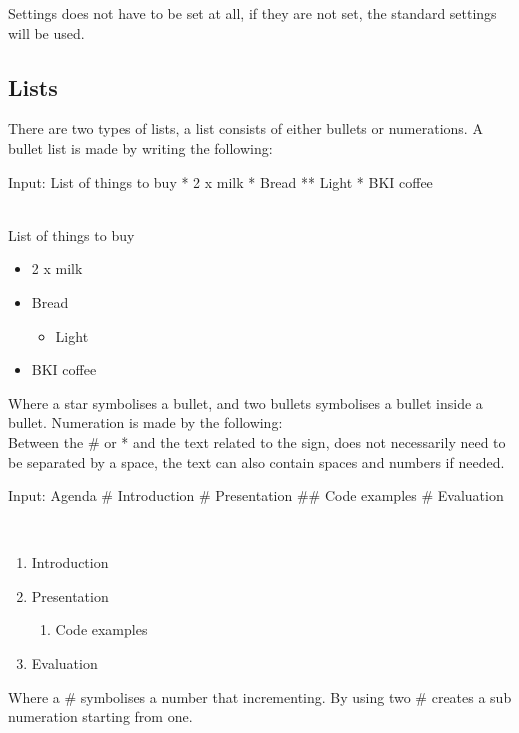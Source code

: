 Settings does not have to be set at all, if they are not set, the standard settings will be used.

\subsection*{Lists}
There are two types of lists, a list consists of either bullets or numerations.
A bullet list is made by writing the following:\\

\begin{spverbatim}
Input:
List of things to buy
* 2 x milk
* Bread
** Light
* BKI coffee
\end{spverbatim}
 
 \\
List of things to buy
\begin{itemize}
\item 2 x milk
\item Bread
\begin{itemize}
\item Light
\end{itemize}
\item BKI coffee
\end{itemize}

Where a star symbolises a bullet, and two bullets symbolises a bullet inside a bullet.
Numeration is made by the following: \\
Between the \# or * and the text related to the sign, does not necessarily need to be separated by a space, the text can also contain spaces and numbers if needed.\\

\begin{spverbatim}
Input:
Agenda
# Introduction
# Presentation
## Code examples
# Evaluation
\end{spverbatim}

 \\
\begin{enumerate}
\item Introduction
\item Presentation
\begin{enumerate}
\item Code examples
\end{enumerate}
\item Evaluation
\end{enumerate}

Where a \# symbolises a number that incrementing. By using two \# creates a sub numeration starting from one.

